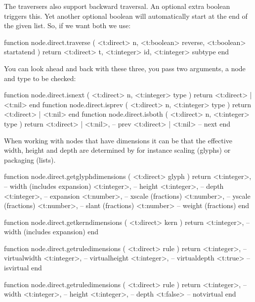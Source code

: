 The traversers also support backward traversal. An optional extra boolean triggers
this. Yet another optional boolean will automatically start at the end of the
given list. So, if we want both we use:

\starttyping[option=LUA]
function node.direct.traverse (
    <t:direct>  n,
    <t:boolean> reverse,
    <t:boolean> startatend
)
    return
        <t:direct>  t,
        <t:integer> id,
        <t:integer> subtype
end
\stoptyping

You can look ahead and back with these three, you pass two arguments, a node and
type to be checked:

\starttyping[option=LUA]
function node.direct.isnext ( <t:direct> n, <t:integer> type )
    return <t:direct> | <t:nil>
end
function node.direct.isprev ( <t:direct> n, <t:integer> type )
    return <t:direct> | <t:nil>
end
function node.direct.isboth ( <t:direct> n, <t:integer> type )
    return
        <t:direct> | <t:nil>, -- prev
        <t:direct> | <t:nil>  -- next
end
\stoptyping

\stopsubsection

\startsubsection[title=Dimensions]

When working with nodes that have dimensions it can be that the effective
width, height and depth are determined by for instance scaling (glyphs) or
packaging (lists).

\starttyping[option=LUA]
function node.direct.getglyphdimensions ( <t:direct> glyph )
    return
        <t:integer>, -- width  (includes expansion)
        <t:integer>, -- height
        <t:integer>, -- depth
        <t:integer>, -- expansion
        <t:number>,  -- xscale (fractions)
        <t:number>,  -- yscale (fractions)
        <t:number>,  -- slant  (fractions)
        <t:number>   -- weight (fractions)
end
\stoptyping

\starttyping[option=LUA]
function node.direct.getkerndimensions ( <t:direct> kern )
    return <t:integer>, -- width (includes expansion)
end
\stoptyping

\starttyping[option=LUA]
function node.direct.getruledimensions ( <t:direct> rule )
    return
        <t:integer>, -- virtualwidth
        <t:integer>, -- virtualheight
        <t:integer>, -- virtualdepth
        <t:true>     -- isvirtual
end

function node.direct.getruledimensions ( <t:direct> rule )
    return
    <t:integer>, -- width
    <t:integer>, -- height
    <t:integer>, -- depth
    <t:false>    -- notvirtual
end
\stoptyping

